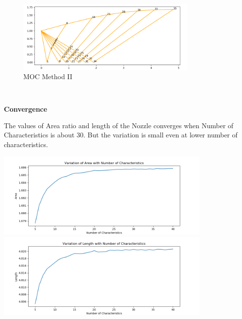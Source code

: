 \begin{figure}[H]
    \centering
    \includegraphics[width=0.8\textwidth]{text/MoC_Mine.png}
    \caption[MOC Method II]{MOC Method II}
    \label{fig:MOC Method I}
\end{figure}\\
\newpage
\begin{flushleft}
\textbf{Convergence}\\
\end{flushleft}
The values of Area ratio and length of the Nozzle converges when Number of Characteristics is about 30. But the variation is small even at lower number of characteristics. \\
\begin{center}
\includegraphics[width=0.8\textwidth]{text/Area Variation.png}\\
\includegraphics[width=0.8\textwidth]{text/Length Variation.png}\\    
\end{center}


\newpage
